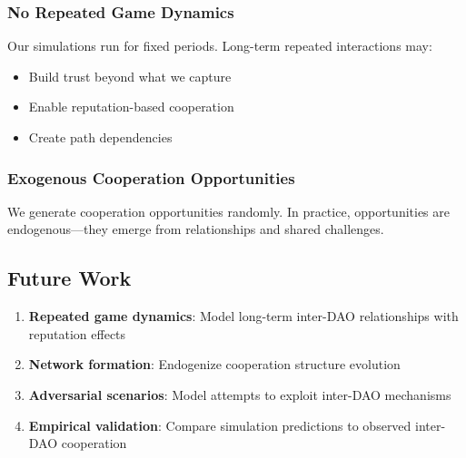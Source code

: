 \subsubsection{No Repeated Game Dynamics}

Our simulations run for fixed periods. Long-term repeated interactions may:
\begin{itemize}
    \item Build trust beyond what we capture
    \item Enable reputation-based cooperation
    \item Create path dependencies
\end{itemize}

\subsubsection{Exogenous Cooperation Opportunities}

We generate cooperation opportunities randomly. In practice, opportunities are endogenous---they emerge from relationships and shared challenges.

\subsection{Future Work}

\begin{enumerate}
    \item \textbf{Repeated game dynamics}: Model long-term inter-DAO relationships with reputation effects
    \item \textbf{Network formation}: Endogenize cooperation structure evolution
    \item \textbf{Adversarial scenarios}: Model attempts to exploit inter-DAO mechanisms
    \item \textbf{Empirical validation}: Compare simulation predictions to observed inter-DAO cooperation
\end{enumerate}
